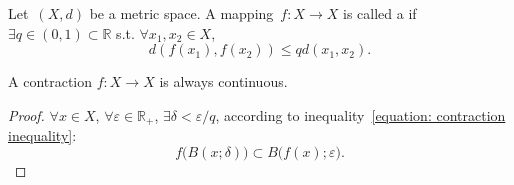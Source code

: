\documentclass[openany]{book}
\begin{document}
\begin{definition}[Contraction]\label{definition: contraction}
	Let~$(X, d)$ be a metric space. 
	A mapping~$f \colon X \to X$ is called a  if~$\exists q \in (0, 1) \subset \mathbb R$ s.t. $\forall x_1,x_2 \in X$, 
	\begin{equation}\label{equation: contraction inequality}
		d(f(x_1), f (x_2)) \leq q d(x_1, x_2).
	\end{equation}
\end{definition}

\begin{lemma}\label{lemma: contraction is continuous}
	A contraction $f \colon X \to X$ is always continuous.
\end{lemma}
\begin{proof}
	$\forall x \in X$, $\forall \varepsilon \in \mathbb R_+ $, $\exists \delta < \varepsilon / q$, according to inequality~\ref{equation: contraction inequality}:
	\[
	f\big( B(x; \delta ) \big) 
	\subset 
	B\big( f(x); \varepsilon \big).
	\]
\end{proof}
\end{document}
